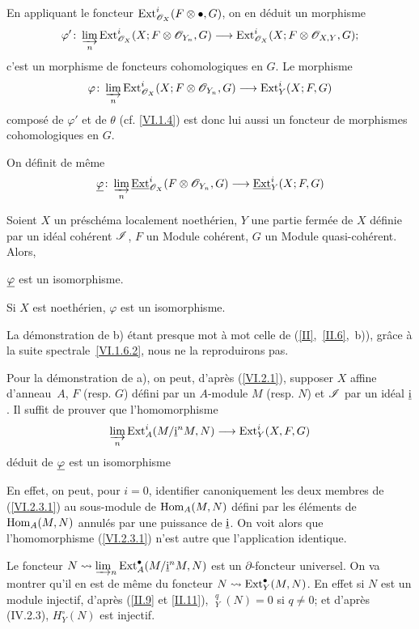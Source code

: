 En appliquant le foncteur $\operatorname{Ext}_{\mathscr{O}_X}^i(F\otimes\bullet, G)$, on en d\'eduit un morphisme
$$
\varphi'\colon \varinjlim_{n} \Ext_{\OX}^i(X;F\otimes \Oo_{Y_n}, G) \to \Ext_{\OX}^i(X;F \otimes \Oo_{X, Y}, G);
$$
c'est un morphisme de foncteurs cohomologiques en $G$. Le morphisme
$$
\varphi\colon \varinjlim_{n} \Ext_{\OX}^i(X;F\otimes \Oo_{Y_n}, G) \to \Ext_Y^i(X;F, G)
$$
compos\'e de $\varphi'$ et de $\theta$ (cf. \ref{VI.1.4}) est donc lui aussi un foncteur de morphismes cohomologiques en $G$.

On d\'efinit de m\^eme
$$
\Sheafphi\colon \varinjlim_n \mathop{\underline{\mathrm{Ext}}}\nolimits_{\OX}^i(F \otimes \Oo_{Y_n}, G) \to \mathop{\underline{\mathrm{Ext}}}\nolimits_Y^i(X;F, G)
$$

\begin{theoreme} \label{VI.2.3}
Soient $X$ un pr\'esch\'ema localement noeth\'erien, $Y$ une partie ferm\'ee de $X$ d\'efinie par un id\'eal coh\'erent $\mathscr I$, $F$ un Module coh\'erent, $G$ un Module quasi-coh\'erent. Alors,
\begin{enumeratea}
\item
$\underline{\varphi}$ est un isomorphisme.
\item
Si $X$ est noeth\'erien, $\varphi$ est un isomorphisme.
\end{enumeratea}
\end{theoreme}

La d\'emonstration de b) \'etant presque mot \`a mot celle de (\ref{II},~\ref{II.6},~b)), gr\^ace \`a la suite spectrale~\ref{VI.1.6.2}, nous ne la reproduirons pas.

Pour la d\'emonstration de a), on peut, d'apr\`es (\ref{VI.2.1}), supposer $X$ affine d'anneau~$A$, $F$ (resp. $G$) d\'efini par un $A$-module $M$ (resp. $N$) et $\mathscr I$ par un id\'eal $\underline{\rm{i}}$. Il suffit de prouver que l'homomorphisme
\begin{equation} \label{VI.2.3.1} \varinjlim_{{n}} \Ext_A^i(M/\underline{\rm{i}}^nM, N) \to \Ext_Y^i(X, F, G)
\end{equation}
d\'eduit de $\underline{\varphi}$ est un isomorphisme

En effet, on peut, pour $i=0$, identifier canoniquement les deux membres de (\ref{VI.2.3.1}) au sous-module de $\operatorname{Hom}_A(M, N)$ d\'efini par les \'el\'ements de $\operatorname{Hom}_A(M, N)$ annul\'es par une puissance de $\underline{\rm{i}}$. On voit alors que l'homomorphisme (\ref{VI.2.3.1}) n'est autre que l'application identique.

Le foncteur $N\rightsquigarrow \varinjlim_{n} \operatorname{Ext}_A^\bullet(M/\underline{\rm{i}}^nM, N)$ est un $\partial$-foncteur universel. On va montrer qu'il en est de m\^eme du foncteur $N \rightsquigarrow \operatorname{Ext}_Y^\bullet(M, N)$. En effet si $N$ est un module injectif, d'apr\`es (\ref{II.9} et \ref{II.11}), $\mathop{\underline{\mathrm{H}}}\nolimits_Y^q(N)=0$ si $q \neq 0$; et d'apr\`es (IV.2.3), $H_Y^{\circ}(N)$ est injectif.

